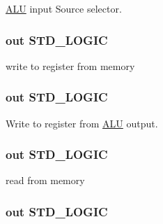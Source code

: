 \hyperlink{class_a_l_u}{\-A\-L\-U} input \-Source selector. 

\hypertarget{class_control_ae18caf473070cf8e735d12ca860fb762}{
\subsubsection[{\-Memto\-Reg}]{ {\bfseries out } {\bfseries \-S\-T\-D\-\_\-\-L\-O\-G\-I\-C } }}\label{class_control_ae18caf473070cf8e735d12ca860fb762}


write to register from memory 

\hypertarget{class_control_a3862189e11b01293ae0279072adc6151}{
\subsubsection[{\-Reg\-Write}]{ {\bfseries out } {\bfseries \-S\-T\-D\-\_\-\-L\-O\-G\-I\-C } }}\label{class_control_a3862189e11b01293ae0279072adc6151}


\-Write to register from \hyperlink{class_a_l_u}{\-A\-L\-U} output. 

\hypertarget{class_control_a703e49c8be2a086810119a4f32c2edd0}{
\subsubsection[{\-Mem\-Read}]{ {\bfseries out } {\bfseries \-S\-T\-D\-\_\-\-L\-O\-G\-I\-C } }}\label{class_control_a703e49c8be2a086810119a4f32c2edd0}


read from memory 

\hypertarget{class_control_af268f4bd077313d14130fa77402beccb}{
\subsubsection[{\-Mem\-Write}]{ {\bfseries out } {\bfseries \-S\-T\-D\-\_\-\-L\-O\-G\-I\-C } }}\label{class_control_af268f4bd077313d14130fa77402beccb}



